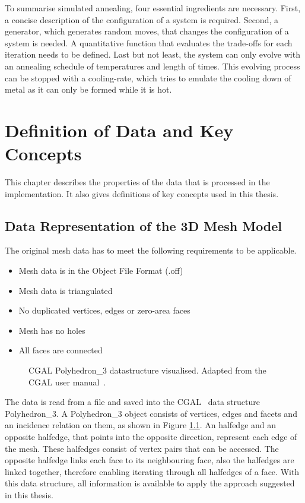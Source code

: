 \documentclass[draft,final]{vutinfth} %
\begin{document}
To summarise simulated annealing, four essential ingredients are necessary. First, a concise description of the configuration of a system is required. Second, a generator, which generates random moves, that changes the configuration of a system is needed. A quantitative function that evaluates the trade-offs for each iteration needs to be defined. Last but not least, the system can only evolve with an annealing schedule of temperatures and length of times. This evolving process can be stopped with a cooling-rate, which tries to emulate the cooling down of metal as it can only be formed while it is hot.


\chapter{Definition of Data and Key Concepts}
\label{chap:definitions}
This chapter describes the properties of the data that is processed in the implementation. It also gives definitions of key concepts used in this thesis.

\section{Data Representation of the 3D Mesh Model}
The original mesh data has to meet the following requirements to be applicable.

\begin{itemize}
    \item Mesh data is in the Object File Format (.off)
    \item Mesh data is triangulated
    \item No duplicated vertices, edges or zero-area faces
    \item Mesh has no holes
    \item All faces are connected
\end{itemize}

\begin{figure}

\caption{CGAL Polyhedron\_3 datastructure visualised. Adapted from the CGAL user manual~\cite{cgal:eb-19a}.}
\label{fig:cgal}
\end{figure}

The data is read from a file and saved into the CGAL~\cite{cgal:eb-19a} data structure Polyhedron\_3. A Polyhedron\_3 object consists of vertices, edges and facets and an incidence relation on them, as shown in Figure \ref{fig:cgal}. An halfedge and an opposite halfedge, that points into the opposite direction, represent each edge of the mesh. These halfedges consist of vertex pairs that can be accessed. The opposite halfedge links each face to its neighbouring face, also the halfedges are linked together, therefore enabling iterating through all halfedges of a face. With this data structure, all information is available to apply the approach suggested in this thesis.
\end{document}
